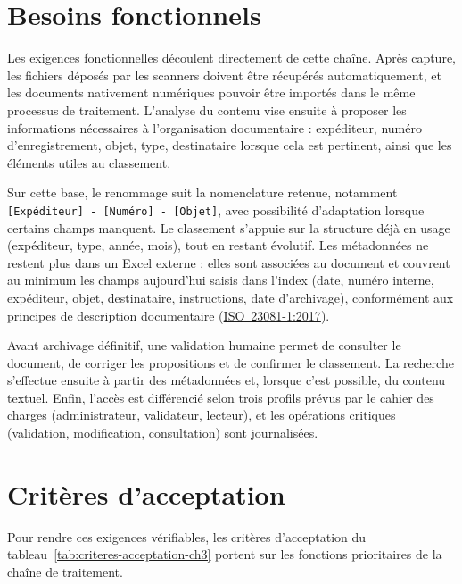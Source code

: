 \documentclass[12pt,a4paper]{report}
\newcommand{\citer}[2]{\hyperref[ref:#1]{#2}}
\begin{document}
\section{Besoins fonctionnels}
Les exigences fonctionnelles découlent directement de cette chaîne. Après capture, les fichiers déposés par les scanners doivent être récupérés automatiquement, et les documents nativement numériques pouvoir être importés dans le même processus de traitement. L'analyse du contenu vise ensuite à proposer les informations nécessaires à l'organisation documentaire : expéditeur, numéro d'enregistrement, objet, type, destinataire lorsque cela est pertinent, ainsi que les éléments utiles au classement.

Sur cette base, le renommage suit la nomenclature retenue, notamment \texttt{[Expéditeur] - [Numéro] - [Objet]}, avec possibilité d'adaptation lorsque certains champs manquent. Le classement s'appuie sur la structure déjà en usage (expéditeur, type, année, mois), tout en restant évolutif. Les métadonnées ne restent plus dans un Excel externe : elles sont associées au document et couvrent au minimum les champs aujourd'hui saisis dans l'index (date, numéro interne, expéditeur, objet, destinataire, instructions, date d'archivage), conformément aux principes de description documentaire (\citer{iso23081}{\mbox{ISO 23081-1:2017}}).

Avant archivage définitif, une validation humaine permet de consulter le document, de corriger les propositions et de confirmer le classement. La recherche s'effectue ensuite à partir des métadonnées et, lorsque c'est possible, du contenu textuel. Enfin, l'accès est différencié selon trois profils prévus par le cahier des charges (administrateur, validateur, lecteur), et les opérations critiques (validation, modification, consultation) sont journalisées.

\section{Critères d'acceptation}
Pour rendre ces exigences vérifiables, les critères d'acceptation du tableau~\ref{tab:criteres-acceptation-ch3} portent sur les fonctions prioritaires de la chaîne de traitement.
\end{document}
